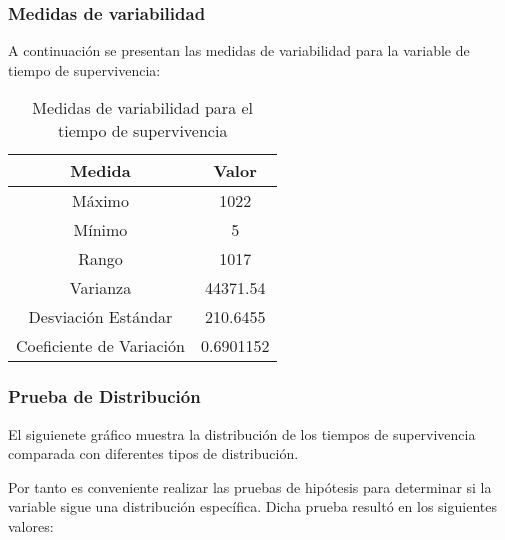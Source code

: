 \documentclass[a4paper,12pt]{article}
\begin{document}
\clearpage

\subsubsection*{Medidas de variabilidad}

A continuación se presentan las medidas de variabilidad para la variable de tiempo de supervivencia:

\begin{table}[h!]
    \centering
    \begin{tabular}{|c|c|}
        \hline
        \textbf{Medida} & \textbf{Valor} \\
        \hline
        Máximo & 1022 \\
        \hline
        Mínimo & 5 \\
        \hline
        Rango & 1017 \\
        \hline
        Varianza & 44371.54 \\
        \hline
        Desviación Estándar & 210.6455 \\
        \hline
        Coeficiente de Variación & 0.6901152 \\
        \hline
    \end{tabular}
    \caption{Medidas de variabilidad para el tiempo de supervivencia}
    \label{tab:medidas_variabilidad}
\end{table}

\subsubsection*{Prueba de Distribución}

El siguienete gráfico muestra la distribución de los tiempos de supervivencia comparada con diferentes tipos de distribución.


Por tanto es conveniente realizar las pruebas de hipótesis para determinar si la variable sigue una distribución específica. Dicha prueba resultó en los siguientes valores:
\end{document}
